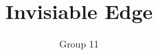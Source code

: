 \documentclass[]{report}
\title{Invisiable Edge}
\author{Group 11}
\begin{document}
\maketitle

\listoftodos



\end{document}
